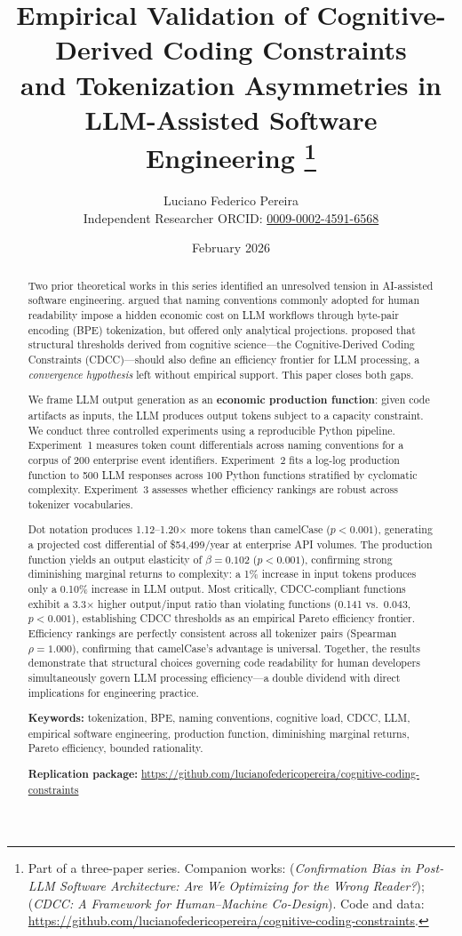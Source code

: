 \documentclass[11pt,a4paper]{article}
\title{%
  Empirical Validation of Cognitive-Derived Coding Constraints\\
  and Tokenization Asymmetries in LLM-Assisted Software Engineering%
  \thanks{%
    Part of a three-paper series. Companion works:
    \citealt{pereira2026a} (\emph{Confirmation Bias in Post-LLM Software
    Architecture: Are We Optimizing for the Wrong Reader?});
    \citealt{pereira2026b} (\emph{CDCC: A Framework for Human--Machine
    Co-Design}).
    Code and data: \url{https://github.com/lucianofedericopereira/cognitive-coding-constraints}.
  }%
}
\author{%
  Luciano Federico Pereira\\
  \small Independent Researcher \quad
  \small ORCID: \href{https://orcid.org/0009-0002-4591-6568}{0009-0002-4591-6568}
}
\date{February 2026}
\begin{document}

\maketitle
\thispagestyle{empty}

\begin{abstract}
Two prior theoretical works in this series identified an unresolved tension
in AI-assisted software engineering. \citet{pereira2026a} argued that naming
conventions commonly adopted for human readability impose a hidden economic cost
on LLM workflows through byte-pair encoding (BPE) tokenization, but offered
only analytical projections. \citet{pereira2026b} proposed that structural
thresholds derived from cognitive science---the Cognitive-Derived Coding
Constraints (CDCC)---should also define an efficiency frontier for LLM
processing, a \emph{convergence hypothesis} left without empirical support.
This paper closes both gaps.

We frame LLM output generation as an \textbf{economic production function}:
given code artifacts as inputs, the LLM produces output tokens subject to
a capacity constraint. We conduct three controlled experiments using a
reproducible Python pipeline. Experiment~1 measures token count differentials
across naming conventions for a corpus of 200 enterprise event identifiers.
Experiment~2 fits a log-log production function to 500 LLM responses across
100 Python functions stratified by cyclomatic complexity. Experiment~3
assesses whether efficiency rankings are robust across tokenizer vocabularies.

Dot notation produces 1.12--1.20$\times$ more tokens than camelCase ($p <
0.001$), generating a projected cost differential of \$54,499/year at
enterprise API volumes. The production function yields an output elasticity
of $\beta = 0.102$ ($p < 0.001$), confirming strong diminishing marginal
returns to complexity: a 1\% increase in input tokens produces only a
0.10\% increase in LLM output. Most critically, CDCC-compliant functions
exhibit a 3.3$\times$ higher output/input ratio than violating functions
(0.141 vs.\ 0.043, $p < 0.001$), establishing CDCC thresholds as an
empirical Pareto efficiency frontier. Efficiency rankings are perfectly
consistent across all tokenizer pairs (Spearman $\rho = 1.000$), confirming
that camelCase's advantage is universal. Together, the results demonstrate
that structural choices governing code readability for human developers
simultaneously govern LLM processing efficiency---a double dividend with
direct implications for engineering practice.

\noindent\textbf{Keywords:} tokenization, BPE, naming conventions, cognitive
load, CDCC, LLM, empirical software engineering, production function,
diminishing marginal returns, Pareto efficiency, bounded rationality.

\noindent\textbf{Replication package:}
\url{https://github.com/lucianofedericopereira/cognitive-coding-constraints}
\end{abstract}
\end{document}
